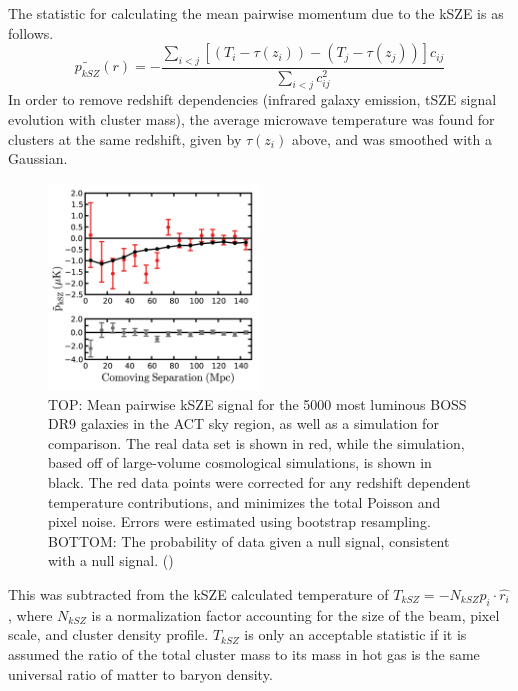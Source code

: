 \documentclass[manuscript]{aastex}
\begin{document}
The statistic for calculating the mean pairwise momentum due to the kSZE is as follows.
\begin{equation}
    \tilde{p_{kSZ}}(r) = - \frac{\sum_{i < j}[(T_{i}-\tau(z_{i})) - (T_{j}-\tau(z_{j}))]c_{ij}}{\sum_{i<j}c^{2}_{ij}}
\end{equation}
In order to remove redshift dependencies (infrared galaxy emission, tSZE signal evolution with cluster mass), the average microwave temperature was found for clusters at the same redshift, given by $\tau(z_{i})$ above, and was smoothed with a Gaussian. 
\begin{figure}
  \vspace{-0.8cm}
    \begin{center}
      \includegraphics[width=0.5\textwidth]{hand1.png}
    \end{center}
\caption[Mean Pairwise Momentum of BOSS DR9 Selected Clusters using kSZE -(\cite{Hand2012})]{TOP: Mean pairwise kSZE signal for the 5000 most luminous BOSS DR9 galaxies in the ACT sky region, as well as a simulation for comparison. The real data set is shown in red, while the simulation, based off of large-volume cosmological simulations, is shown in black. The red data points were corrected for any redshift dependent temperature contributions, and minimizes the total Poisson and pixel noise. Errors were estimated using bootstrap resampling. BOTTOM: The probability of data given a null signal, consistent with a null signal. (\cite{Hand2012})}
\label{fig:hand1}
\vspace{-0.4cm}
\end{figure}
This was subtracted from the kSZE calculated temperature of $T_{kSZ} = - N_{kSZ} p_{i} \cdot \hat{r_{i}}$, where $N_{kSZ}$ is a normalization factor accounting for the size of the beam, pixel scale, and cluster density profile. $T_{kSZ}$ is only an acceptable statistic if it is assumed the ratio of the total cluster mass to its mass in hot gas is the same universal ratio of matter to baryon density. 
\end{document}
